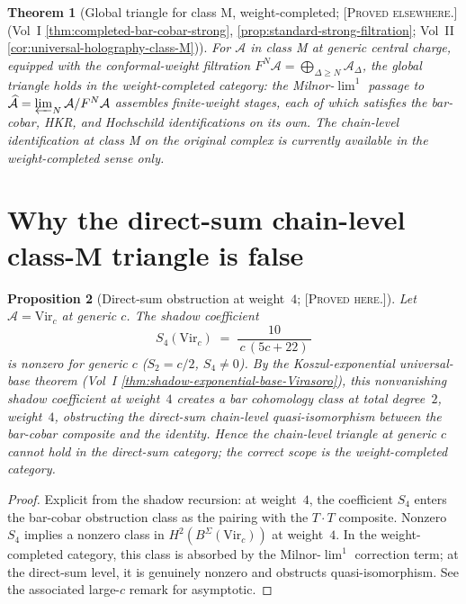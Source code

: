 \documentclass[11pt]{amsart}
\newtheorem{theorem}{Theorem}[section]
\newtheorem{proposition}[theorem]{Proposition}
\theoremstyle{definition}
\theoremstyle{remark}
\providecommand{\cA}{\mathcal{A}}
\providecommand{\ClaimStatusProvedHere}{\textsc{[Proved here.]}}
\providecommand{\ClaimStatusProvedElsewhere}{\textsc{[Proved elsewhere.]}}
\begin{document}
\begin{theorem}[Global triangle for class M, weight-completed;
\ClaimStatusProvedElsewhere (Vol~I
\ref*{thm:completed-bar-cobar-strong},
\ref*{prop:standard-strong-filtration};
Vol~II \ref*{cor:universal-holography-class-M})]%
\label{thm:triangle-classM-completed}%
For $\cA$ in class M at generic central charge, equipped with the
conformal-weight filtration
$F^N\cA = \bigoplus_{\Delta \ge N}\cA_\Delta$, the global triangle
holds in the weight-completed category: the Milnor-$\lim^1$ passage to
$\widehat{\cA} = \varprojlim_N \cA/F^N\cA$ assembles finite-weight
stages, each of which satisfies the bar-cobar, HKR, and Hochschild
identifications on its own. The chain-level identification at class M
on the original complex is currently available in the
weight-completed sense only.
\end{theorem}

\section{Why the direct-sum chain-level class-M triangle is false}
\label{sec:direct-sum-classM-false}

\begin{proposition}[Direct-sum obstruction at weight~$4$;
\ClaimStatusProvedHere]%
\label{prop:direct-sum-obstruction}%
Let $\cA = \mathrm{Vir}_c$ at generic $c$. The shadow coefficient
\[
  S_4(\mathrm{Vir}_c) \;=\;
  \frac{10}{\,c\,(5c + 22)\,}
\]
is nonzero for generic $c$ ($S_2 = c/2$, $S_4 \ne 0$). By
the Koszul-exponential universal-base theorem (Vol~I
\ref*{thm:shadow-exponential-base-Virasoro}), this nonvanishing
shadow coefficient at weight~$4$ creates a bar cohomology class
at total degree~$2$, weight~$4$, obstructing the direct-sum
chain-level quasi-isomorphism between the bar-cobar composite
and the identity. Hence the chain-level triangle at generic $c$
cannot hold in the direct-sum category; the correct scope is
the weight-completed category.
\end{proposition}

\begin{proof}
Explicit from the shadow recursion: at weight~$4$, the coefficient
$S_4$ enters the bar-cobar obstruction class as the pairing with the
$T \cdot T$ composite. Nonzero $S_4$ implies a nonzero class in
$H^2(B^\Sigma(\mathrm{Vir}_c))$ at weight~$4$. In the
weight-completed category, this class is absorbed by the Milnor-$\lim^1$
correction term; at the direct-sum level, it is genuinely nonzero and
obstructs quasi-isomorphism. See the associated large-$c$ remark for
asymptotic.
\end{proof}
\end{document}
